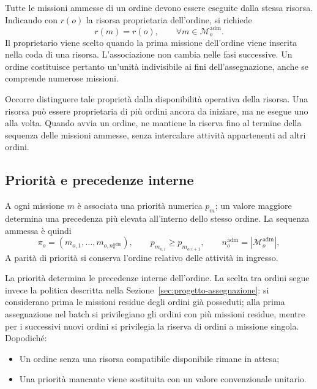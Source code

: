 Tutte le missioni ammesse di un ordine devono essere eseguite dalla stessa
risorsa. Indicando con $r(o)$ la risorsa proprietaria dell'ordine, si richiede
\begin{equation}
    r(m)=r(o),\qquad \forall m\in\mathcal M_o^{\mathrm{adm}}.
\end{equation}
Il proprietario viene scelto quando la prima missione dell'ordine viene
inserita nella coda di una risorsa. L'associazione non cambia nelle fasi successive. Un ordine costituisce pertanto un'unità indivisibile
ai fini dell'assegnazione, anche se comprende numerose missioni.

Occorre distinguere tale proprietà dalla disponibilità operativa della
risorsa. Una risorsa può essere proprietaria di più ordini ancora da iniziare,
ma ne esegue uno alla volta. Quando avvia un ordine, ne mantiene la riserva
fino al termine della sequenza delle missioni ammesse, senza intercalare
attività appartenenti ad altri ordini.

\subsection{Priorità e precedenze interne}

A ogni missione $m$ è associata una priorità numerica $p_m$; un valore
maggiore determina una precedenza più elevata all'interno dello stesso
ordine. La sequenza ammessa è quindi
\begin{equation}
    \pi_o=(m_{o,1},\ldots,m_{o,n_o^{\mathrm{adm}}}),
    \qquad p_{m_{o,i}}\geq p_{m_{o,i+1}},
    \qquad n_o^{\mathrm{adm}}=|\mathcal M_o^{\mathrm{adm}}|,
\end{equation}
A parità di priorità si conserva l'ordine relativo delle attività in ingresso.

La priorità determina le precedenze interne dell'ordine. La scelta tra
ordini segue invece la politica descritta nella
Sezione~\ref{sec:progetto-assegnazione}: si considerano prima le missioni
residue degli ordini già posseduti; alla prima assegnazione nel batch si
privilegiano gli ordini con più missioni residue, mentre per i successivi
nuovi ordini si privilegia la riserva di ordini a missione singola. Dopodiché:
\begin{itemize}
	\item 
	Un ordine senza una risorsa compatibile disponibile rimane in attesa;
	\item 
	Una priorità mancante viene sostituita con un valore convenzionale unitario.
\end{itemize}


